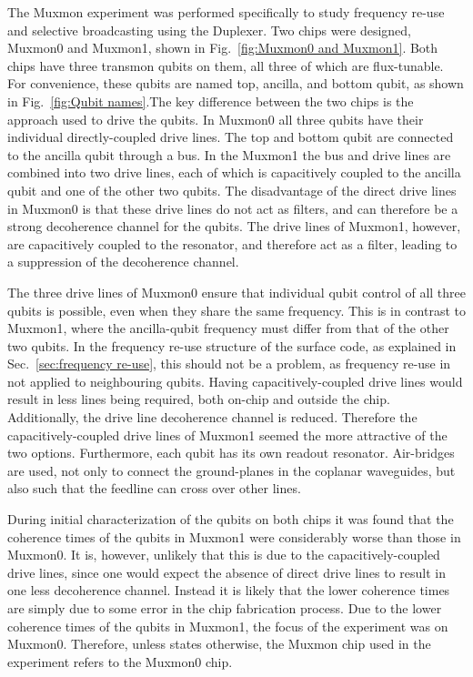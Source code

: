       The Muxmon experiment was performed specifically to study frequency re-use and selective broadcasting using the Duplexer. Two chips were designed, Muxmon0 and Muxmon1, shown in Fig.~\ref{fig:Muxmon0 and Muxmon1}. Both chips have three transmon qubits on them, all three of which are flux-tunable. For convenience, these qubits are named top, ancilla, and bottom qubit, as shown in Fig.~\ref{fig:Qubit names}.The key difference between the two chips is the approach used to drive the qubits. In Muxmon0 all three qubits have their individual directly-coupled drive lines. The top and bottom qubit are connected to the ancilla qubit through a bus. In the Muxmon1 the bus and drive lines are combined into two drive lines, each of which is capacitively coupled to the ancilla qubit and one of the other two qubits. The disadvantage of the direct drive lines in Muxmon0 is that these drive lines do not act as filters, and can therefore be a strong decoherence channel for the qubits. The drive lines of Muxmon1, however, are capacitively coupled to the resonator, and therefore act as a filter, leading to a suppression of the decoherence channel.

      The three drive lines of Muxmon0 ensure that individual qubit control of all three qubits is possible, even when they share the same frequency. This is in contrast to Muxmon1, where the ancilla-qubit frequency must differ from that of the other two qubits. In the frequency re-use structure of the surface code, as explained in Sec.~\ref{sec:frequency re-use}, this should not be a problem, as frequency re-use in not applied to neighbouring qubits. Having capacitively-coupled drive lines would result in less lines being required, both on-chip and outside the chip. Additionally, the drive line decoherence channel is reduced. Therefore the capacitively-coupled drive lines of Muxmon1 seemed the more attractive of the two options. Furthermore, each qubit has its own readout resonator. Air-bridges are used, not only to connect the ground-planes in the coplanar waveguides, but also such that the feedline can cross over other lines.

      During initial characterization of the qubits on both chips it was found that the coherence times of the qubits in Muxmon1 were considerably worse than those in Muxmon0. It is, however, unlikely that this is due to the capacitively-coupled drive lines, since one would expect the absence of direct drive lines to result in one less decoherence channel. Instead it is likely that the lower coherence times are simply due to some error in the chip fabrication process. Due to the lower coherence times of the qubits in Muxmon1, the focus of the experiment was on Muxmon0. Therefore, unless states otherwise, the Muxmon chip used in the experiment refers to the Muxmon0 chip.



